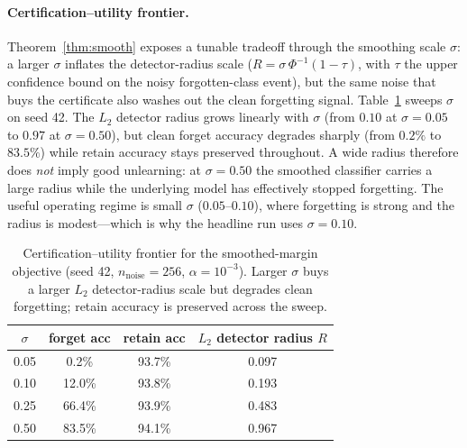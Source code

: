 \documentclass[11pt]{article}
\begin{document}
\paragraph{Certification--utility frontier.} Theorem~\ref{thm:smooth} exposes a tunable tradeoff through the smoothing scale $\sigma$: a larger $\sigma$ inflates the detector-radius scale ($R = \sigma\,\Phi^{-1}(1-\tau)$, with $\tau$ the upper confidence bound on the noisy forgotten-class event), but the same noise that buys the certificate also washes out the clean forgetting signal. Table~\ref{tab:sigma-frontier} sweeps $\sigma$ on seed 42. The $L_2$ detector radius grows linearly with $\sigma$ (from $0.10$ at $\sigma{=}0.05$ to $0.97$ at $\sigma{=}0.50$), but clean forget accuracy degrades sharply (from $0.2\%$ to $83.5\%$) while retain accuracy stays preserved throughout. A wide radius therefore does \emph{not} imply good unlearning: at $\sigma{=}0.50$ the smoothed classifier carries a large radius while the underlying model has effectively stopped forgetting. The useful operating regime is small $\sigma$ ($0.05$--$0.10$), where forgetting is strong and the radius is modest---which is why the headline run uses $\sigma{=}0.10$.

\begin{table}[t]
  \centering
  \small
  \begin{tabular}{c c c c}
    \toprule
    $\sigma$ & forget acc & retain acc & $L_2$ detector radius $R$ \\
    \midrule
    0.05 & 0.2\%  & 93.7\% & 0.097 \\
    0.10 & 12.0\% & 93.8\% & 0.193 \\
    0.25 & 66.4\% & 93.9\% & 0.483 \\
    0.50 & 83.5\% & 94.1\% & 0.967 \\
    \bottomrule
  \end{tabular}
  \caption{Certification--utility frontier for the smoothed-margin objective (seed 42, $n_{\text{noise}}=256$, $\alpha=10^{-3}$). Larger $\sigma$ buys a larger $L_2$ detector-radius scale but degrades clean forgetting; retain accuracy is preserved across the sweep.}
  \label{tab:sigma-frontier}
\end{table}
\end{document}
